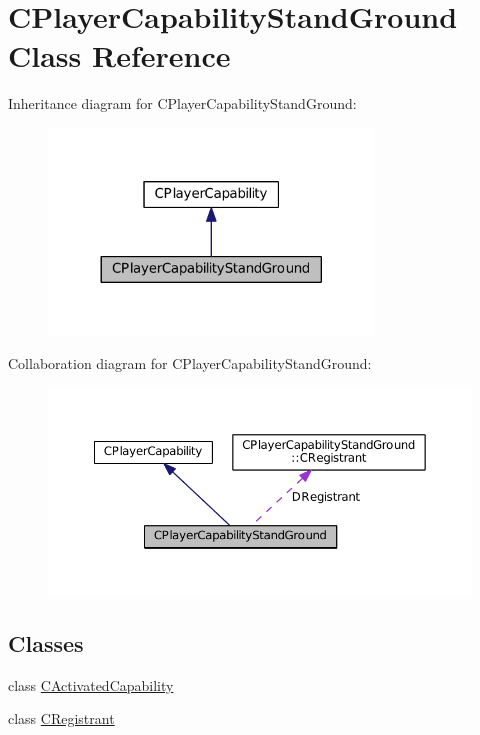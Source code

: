 \hypertarget{classCPlayerCapabilityStandGround}{}\section{C\+Player\+Capability\+Stand\+Ground Class Reference}
\label{classCPlayerCapabilityStandGround}


Inheritance diagram for C\+Player\+Capability\+Stand\+Ground\+:
\nopagebreak
\begin{figure}[H]
\begin{center}
\leavevmode
\includegraphics[width=245pt]{classCPlayerCapabilityStandGround__inherit__graph}
\end{center}
\end{figure}


Collaboration diagram for C\+Player\+Capability\+Stand\+Ground\+:
\nopagebreak
\begin{figure}[H]
\begin{center}
\leavevmode
\includegraphics[width=350pt]{classCPlayerCapabilityStandGround__coll__graph}
\end{center}
\end{figure}
\subsection*{Classes}
\begin{DoxyCompactItemize}
\item 
class \hyperlink{classCPlayerCapabilityStandGround_1_1CActivatedCapability}{C\+Activated\+Capability}
\item 
class \hyperlink{classCPlayerCapabilityStandGround_1_1CRegistrant}{C\+Registrant}
\end{DoxyCompactItemize}
